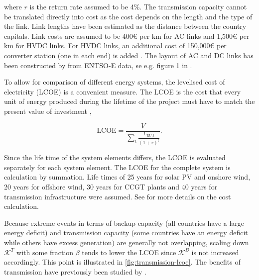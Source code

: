 \documentclass[a4paper, 5p, sort&compress]{elsarticle}%
\newcommand{\paren}[1]{\left(#1\right)}
\begin{document}
where $r$ is the return rate assumed to be 4\%. The transmission
capacity cannot be translated directly into cost as the cost depends
on the length and the type of the link. Link lengths have been
estimated as the distance between the country capitals. Link costs are
assumed to be 400\euro{}
per km for AC links and 1,500\euro{}
per km for HVDC links. For HVDC links, an additional cost of
150,000\euro{}
per converter station (one in each end) is added
\cite{McKinsey, Schaber, Schaber2}. The layout of AC and DC links has
been constructed by \cite{rolando2014} from ENTSO-E data, se
e.g. figure 1 in \cite{Sensitivity}.


To allow for comparison of different energy systems, the levelised
cost of electricity (LCOE) is a convenient measure. The LCOE is the
cost that every unit of energy produced during the lifetime of the
project must have to match the present value of investment
\cite{Short1995},

\begin{equation}
  \label{eq:7}
  \text{LCOE} = \frac{V}{\sum_{t} \frac{L_{EU,
        t}}{\paren{1+r}^{t}}} .
\end{equation}

Since the life time of the system elements differs, the LCOE is
evaluated separately for each system element. The LCOE for the
complete system is calculation by summation. Life times of 25 years
for solar PV and onshore wind, 20 years for offshore wind, 30 years
for CCGT plants and 40 years for transmission infrastructure were
assumed. See \cite{Sensitivity} for more details on the cost
calculation.

Because extreme events in terms of backup capacity (all countries have
a large energy deficit) and transmission capacity (some countries have
an energy deficit while others have excess generation) are generally
not overlapping, scaling down $\mathcal{K}^{T}$ with some fraction
$\beta$ tends to lower the LCOE since $\mathcal{K}^{B}$ is not increased
accordingly. This point is illustrated in
\cref{fig:transmission-lcoe}. The benefits of transmission have
previously been studied by \cite{Rodriguez2013}.
\end{document}
